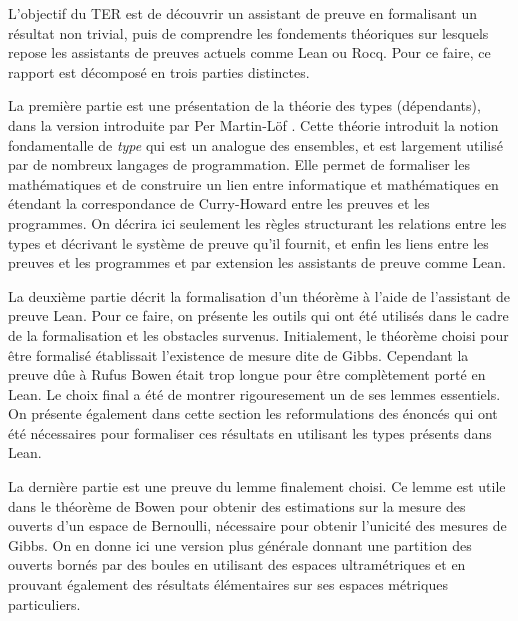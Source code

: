 \documentclass[../rapport.tex]{subfiles}
\begin{document}
  L'objectif du TER est de découvrir un assistant de preuve en formalisant un résultat non trivial,
  puis de comprendre les fondements théoriques sur lesquels repose les assistants de preuves actuels comme Lean ou Rocq.
  Pour ce faire, ce rapport est décomposé en trois parties distinctes.
  \vspace{0em}

  La première partie est une présentation de la théorie des types (dépendants),
  dans la version introduite par Per Martin-Löf \cite{martin2021intuitionistic}.
  Cette théorie introduit la notion fondamentalle de \textit{type} qui est un analogue des ensembles,
  et est largement utilisé par de nombreux langages de programmation.
  Elle permet de formaliser les mathématiques et de construire un lien entre informatique et mathématiques en étendant
  la correspondance de Curry-Howard entre les preuves et les programmes.
  On décrira ici seulement les règles structurant les relations entre les types et décrivant le système de preuve qu'il fournit,
  et enfin les liens entre les preuves et les programmes et par extension les assistants de preuve comme Lean.
  \vspace{1em}

  La deuxième partie décrit la formalisation d'un théorème à l'aide de l'assistant de preuve Lean.
  Pour ce faire, on présente les outils qui ont été utilisés dans le cadre de la formalisation et les obstacles survenus.
  Initialement, le théorème choisi pour être formalisé établissait l'existence de mesure dite de Gibbs.
  Cependant la preuve dûe à Rufus Bowen \cite{bowen} était trop longue pour être complètement porté en Lean.
  Le choix final a été de montrer rigouresement un de ses lemmes essentiels.
  On présente également dans cette section les reformulations des énoncés qui ont été nécessaires pour formaliser
  ces résultats en utilisant les types présents dans Lean.
  \vspace{1em}

  La dernière partie est une preuve du lemme finalement choisi.
  Ce lemme est utile dans le théorème de Bowen pour obtenir des estimations sur la mesure des ouverts d'un espace de Bernoulli,
  nécessaire pour obtenir l'unicité des mesures de Gibbs.
  On en donne ici une version plus générale donnant une partition des ouverts bornés par des boules en utilisant des espaces ultramétriques
  et en prouvant également des résultats élémentaires sur ses espaces métriques particuliers.
\end{document}
